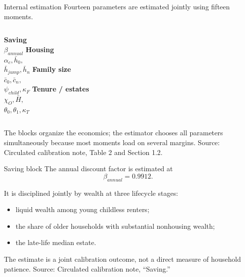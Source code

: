 \documentclass[aspectratio=169,11pt]{beamer}
\newcommand{\source}[1]{\vfill{\color{Muted}\tiny Source: #1}}
\newcommand{\tightitems}{\setlength{\itemsep}{0.55em}}
\begin{document}
\begin{frame}{Internal estimation}
  \large
  Fourteen parameters are estimated jointly using fifteen moments.

  \vspace{0.9em}
  \begin{columns}[T,onlytextwidth]
      \textbf{Saving}\\[0.35em]
      $\beta_{annual}$
      \textbf{Housing}\\[0.35em]
      $\alpha_c,\bar h_0,$\\
      $\bar h_{jump},\bar h_n$
      \textbf{Family size}\\[0.35em]
      $\bar c_0,\bar c_n,$\\
      $\psi_{child},\kappa_F$
      \textbf{Tenure / estates}\\[0.35em]
      $\chi_O,\bar H,$\\
      $\theta_0,\theta_1,\kappa_T$
  \end{columns}

  \vspace{1.3em}
  The blocks organize the economics; the estimator chooses all parameters simultaneously because most moments load on several margins.
  \source{Circulated calibration note, Table 2 and Section 1.2.}
\end{frame}

\begin{frame}{Saving block}
  \large
  The annual discount factor is estimated at
  \[
    \beta_{annual}=0.9912.
  \]

  It is disciplined jointly by wealth at three lifecycle stages:
  \begin{itemize}\tightitems
    \item liquid wealth among young childless renters;
    \item the share of older households with substantial nonhousing wealth;
    \item the late-life median estate.
  \end{itemize}

  The estimate is a joint calibration outcome, not a direct measure of household patience.
  \source{Circulated calibration note, ``Saving.''}
\end{frame}
\end{document}
